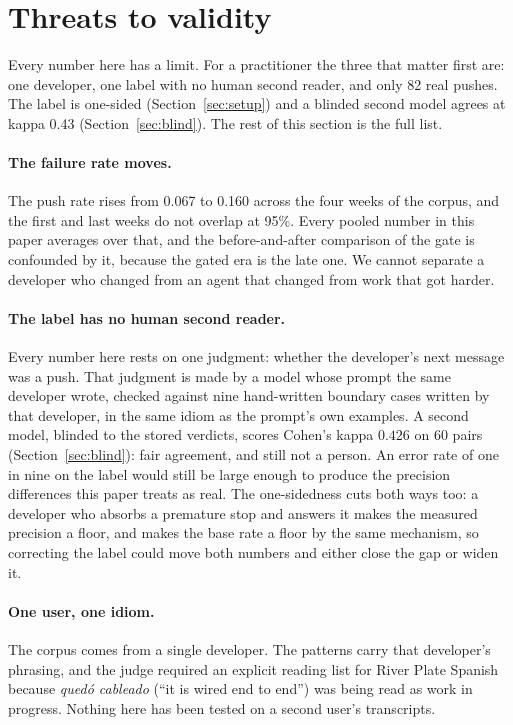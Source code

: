 \section{Threats to validity}
\label{sec:threats}

Every number here has a limit. For a practitioner the three that matter
first are: one developer, one label with no human second reader, and only
82 real pushes. The label is one-sided (Section~\ref{sec:setup}) and a
blinded second model agrees at kappa 0.43 (Section~\ref{sec:blind}). The
rest of this section is the full list.

\paragraph{The failure rate moves.} The push rate rises from 0.067 to 0.160
across the four weeks of the corpus, and the first and last weeks do not
overlap at 95\%. Every pooled number in this paper averages over that, and the
before-and-after comparison of the gate is confounded by it, because the gated
era is the late one. We cannot separate a developer who changed from an agent
that changed from work that got harder.

\paragraph{The label has no human second reader.} Every number here rests on one
judgment: whether the developer's next message was a push. That judgment is
made by a model whose prompt the same developer wrote, checked against nine
hand-written boundary cases written by that developer, in the same idiom as
the prompt's own examples. A second model, blinded to the stored verdicts,
scores Cohen's kappa $0.426$ on 60 pairs (Section~\ref{sec:blind}): fair
agreement, and still not a person. An error rate of one in nine on the
label would still be large enough to produce the precision differences
this paper treats as real.
The one-sidedness cuts both ways too: a developer who absorbs a premature stop
and answers it makes the measured precision a floor, and makes the base rate a
floor by the same mechanism, so correcting the label could move both numbers
and either close the gap or widen it.

\paragraph{One user, one idiom.} The corpus comes from a single developer. The
patterns carry that developer's phrasing, and the judge required an explicit
reading list for River Plate Spanish because \emph{qued\'o cableado} (``it is
wired end to end'') was being read as work in progress. Nothing here has been
tested on a second user's transcripts.


